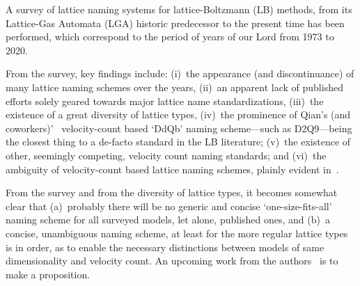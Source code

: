     A survey of lattice naming systems for  lattice-Boltzmann  (LB)  methods,  from  its  Lattice-Gas  Automata  (LGA)  historic
    predecessor to the present time has been performed, which correspond to the period of years of our Lord from 1973 to 2020.

    From the survey, key findings include: (i)~the appearance (and discontinuance) of  many  lattice  naming  schemes  over  the
    years, (ii)~an apparent lack of published efforts solely geared  towards  major  lattice  name  standardizations,  (iii)~the
    existence of a great diversity of lattice types, (iv)~the prominence  of  Qian's  (and  coworkers)'~\cite{1990-QianYH-Paris,
    1991-QianYH+LallemandP-AdvKinTheoContMech} velocity-count based `DdQb' naming  scheme---such  as  D2Q9---being  the  closest
    thing to a de-facto standard in the LB literature; (v)~the existence of other, seemingly competing,  velocity  count  naming
    standards;   and   (vi)~the   ambiguity   of   velocity-count   based    lattice    naming    schemes,    plainly    evident
    in~\cite{2014-MengJ+ZhangY-JComputPhys, 2017-PengY+ZhangJM-MathProblEng}.

    From the survey and from the diversity of lattice types, it becomes somewhat  clear  that  (a)~probably  there  will  be  no
    generic and concise `one-size-fits-all' naming scheme for all surveyed models, let alone, published ones, and (b)~a concise,
    unambiguous naming scheme, at least for the more regular lattice types is in order, as to enable the necessary  distinctions
    between    models    of    same    dimensionality    and    velocity    count.    An     upcoming     work     from     the
    authors~\cite{2020-NaaktgeborenC+AndradeFN-BravLatNam-engrXiv-rev00} is to make a proposition.


